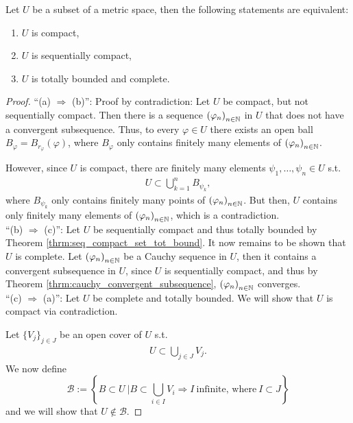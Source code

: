 \begin{theorem}\label{thrm:compact_seq_totally_bound_compl}
	Let $U$ be a subset of a metric space, then the following statements are equivalent:
	\begin{enumerate}[label=(\alph*)]
		\item $U$ is compact, 
		\item $U$ is sequentially compact,
		\item $U$ is totally bounded and complete.
	\end{enumerate}
\end{theorem}

\begin{proof}
	\enquote{(a) $\Longrightarrow$ (b)}: Proof by contradiction: Let $U$ be compact, but not sequentially compact. Then there is a sequence $\seq[\varphi_n]$ in $U$ that does not have a convergent subsequence. Thus, to every $\varphi\in U$ there exists an open ball $B_{\varphi} = B_{r_\varphi}(\varphi)$, where $B_{\varphi}$ only contains finitely many elements of $\seq[\varphi_n]$.
	
	However, since $U$ is compact, there are finitely many elements $\psi_1, \dots, \psi_n\in U$ s.t. 
	\begin{align*}
		U \subset \bigcup_{k=1}^{n}B_{\psi_k}, 
	\end{align*}
	where $B_{\psi_k}$ only contains finitely many points of $\seq[\varphi_n]$. But then, $U$ contains only finitely many elements of $\seq[\varphi_n]$, which is a contradiction.
	\\
	
	\enquote{(b) $\Longrightarrow$ (c)}: Let $U$ be sequentially compact and thus totally bounded by Theorem \eqref{thrm:seq_compact_set_tot_bound}. It now remains to be shown that $U$ is complete. Let $\seq[\varphi_n]$ be a Cauchy sequence in $U$, then it contains a convergent subsequence in $U$, since $U$ is sequentially compact, and thus by Theorem \ref{thrm:cauchy_convergent_subsequence}, $\seq[\varphi_n]$ converges.
	\\
	
	\enquote{(c) $\Longrightarrow$ (a)}: Let $U$ be complete and totally bounded. We will show that $U$ is compact via contradiction.
	
	Let $\{V_j\}_{j\in J}$ be an open cover of $U$ s.t. 
	\begin{align}\label{eq:open_cover}
		U\subset \bigcup_{j\in J}V_j.
	\end{align}
	We now define
	$$\mathcal B := \left\{ \left.B\subset U\ \right\vert B\subset \bigcup_{i\in I}V_i\Rightarrow I\ \text{infinite, where}\ I \subset J \right\}$$
	and we will show that $U\notin \mathcal B$.
	

\end{proof}
